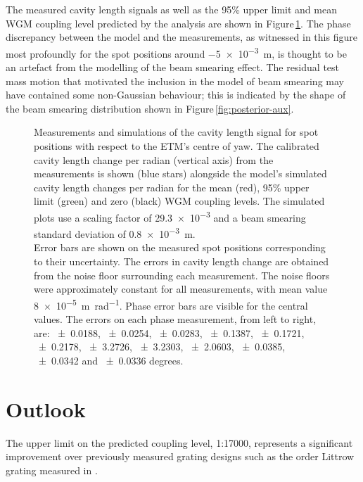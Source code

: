 The measured cavity length signals as well as the 95\% upper limit and mean \gls{WGM} coupling level predicted by the analysis are shown in Figure\,\ref{fig:wgm-coupling}. The phase discrepancy between the model and the measurements, as witnessed in this figure most profoundly for the spot positions around \SI{-5e-3}{\meter}, is thought to be an artefact from the modelling of the beam smearing effect. The residual test mass motion that motivated the inclusion in the model of beam smearing may have contained some non-Gaussian behaviour; this is indicated by the shape of the beam smearing distribution shown in Figure\,\ref{fig:posterior-aux}.

\begin{figure}
  \centering
  
  \caption[Measurements and simulations of the cavity length signal for spot positions with respect to the end test mass's centre of yaw]{\label{fig:wgm-coupling}Measurements and simulations of the cavity length signal for spot positions with respect to the \gls{ETM}'s centre of yaw. The calibrated cavity length change per radian (vertical axis) from the measurements is shown (blue stars) alongside the model's simulated cavity length changes per radian for the mean (red), 95\% upper limit (green) and zero (black) \gls{WGM} coupling levels. The simulated plots use a scaling factor of \num{29.3e-3} and a beam smearing standard deviation of \SI{0.8e-3}{\meter}.
  \bigskip
  \\ Error bars are shown on the measured spot positions corresponding to their uncertainty. The errors in cavity length change are obtained from the noise floor surrounding each measurement. The noise floors were approximately constant for all measurements, with mean value \SI{8e-5}{\meter \per \radian}. Phase error bars are visible for the central values. The errors on each phase measurement, from left to right, are: \num{+-0.0188}, \num{+-0.0254}, \num{+-0.0283}, \num{+-0.1387}, \num{+-0.1721}, \num{+-0.2178}, \num{+-3.2726}, \num{+-3.2303}, \num{+-2.0603}, \num{+-0.0385}, \num{+-0.0342} and \num{+-0.0336} degrees.}
\end{figure}

\section{Outlook}
The upper limit on the predicted coupling level, 1:17000, represents a significant improvement over previously measured grating designs such as the  order Littrow grating measured in \cite{Barr2011}.

